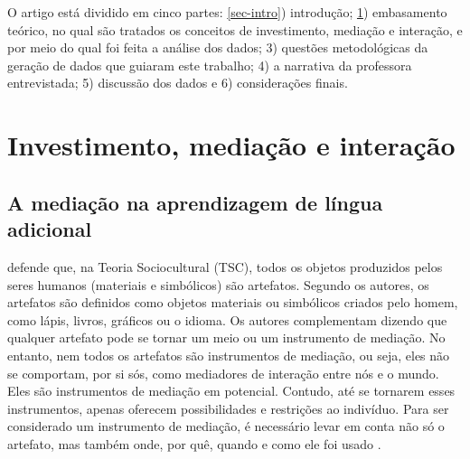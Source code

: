 \documentclass{textolivre}
\begin{document}
O artigo está dividido em cinco partes: \ref{sec-intro}) introdução; \ref{sec-2}) embasamento teórico, no qual são tratados os conceitos de investimento, mediação e interação, e por meio do qual foi feita a análise dos dados; 3) questões metodológicas da geração de dados que guiaram este trabalho; 4) a narrativa da professora entrevistada; 5) discussão dos dados e 6) considerações finais.

\section{Investimento, mediação e interação}\label{sec-2}
\subsection{A mediação na aprendizagem de língua adicional}
\textcite{swain_sociocultural_2015} defende que, na Teoria Sociocultural (TSC), todos os objetos produzidos pelos seres humanos (materiais e simbólicos) são artefatos. Segundo os autores, os artefatos são definidos como objetos materiais ou simbólicos criados pelo homem, como lápis, livros, gráficos ou o idioma. Os autores complementam dizendo que qualquer artefato pode se tornar um meio ou um instrumento de mediação. No entanto, nem todos os artefatos são instrumentos de mediação, ou seja, eles não se comportam, por si sós, como mediadores de interação entre nós e o mundo. Eles são instrumentos de mediação em potencial. Contudo, até se tornarem esses instrumentos, apenas oferecem possibilidades e restrições ao indivíduo. Para ser considerado um instrumento de mediação, é necessário levar em conta não só o artefato, mas também onde, por quê, quando e como ele foi usado \cite{swain_sociocultural_2015}.
\end{document}

